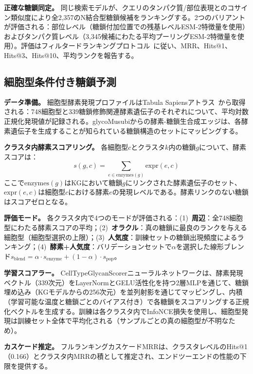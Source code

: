 \documentclass[11pt,a4paper]{ltjsarticle}
\begin{document}
\textbf{正確な糖鎖同定。}
同じ検索モデルが、クエリのタンパク質/部位表現とのコサイン類似度により全2,357のN結合型糖鎖候補をランキングする。2つのバリアントが評価される：部位レベル（糖鎖付加位置での残基レベルESM-2特徴量を使用）およびタンパク質レベル（3,345候補にわたる平均プーリングESM-2特徴量を使用）。評価はフィルタードランキングプロトコル~\cite{bordes2013}に従い、MRR、Hits@1、Hits@3、Hits@10、平均ランクを報告する。

\subsection{細胞型条件付き糖鎖予測}

\textbf{データ準備。}
細胞型酵素発現プロファイルはTabula Sapiensアトラス~\cite{tabulasapiens2022}から取得される：748細胞型と339糖鎖修飾関連酵素遺伝子のそれぞれについて、平均対数正規化発現値が記録される。glycoMusubiからの酵素-糖鎖生合成エッジは、各酵素遺伝子を生成することが知られている糖鎖構造のセットにマッピングする。

\textbf{クラスタ内酵素スコアリング。}
各細胞型$c$とクラスタ$k$内の糖鎖$g$について、酵素スコアは：
\begin{equation}
s(g, c) = \sum_{e \in \text{enzymes}(g)} \text{expr}(e, c)
\end{equation}
ここで$\text{enzymes}(g)$はKGにおいて糖鎖$g$にリンクされた酵素遺伝子のセット、$\text{expr}(e, c)$は細胞型$c$における酵素$e$の発現レベルである。酵素リンクのない糖鎖はスコアゼロとなる。

\textbf{評価モード。}
各クラスタ内で4つのモードが評価される：(1)~\textbf{周辺}：全748細胞型にわたる酵素スコアの平均；(2)~\textbf{オラクル}：真の糖鎖に最良のランクを与える細胞型（細胞型選択の上限）；(3)~\textbf{人気度}：訓練セットの糖鎖出現頻度によるランキング；(4)~\textbf{酵素+人気度}：バリデーションセットで$\alpha$を選択した線形ブレンド$s_{\text{blend}} = \alpha \cdot s_{\text{enzyme}} + (1 - \alpha) \cdot s_{\text{pop}}$。

\textbf{学習スコアラー。}
CellTypeGlycanScorerニューラルネットワークは、酵素発現ベクトル（339次元）をLayerNormとGELU活性化を持つ2層MLPを通じて、糖鎖埋め込み（KGモデルからの256次元）を並列射影を通じてマッピングし、内積（学習可能な温度と糖鎖ごとのバイアス付き）で各糖鎖をスコアリングする正規化ベクトルを生成する。訓練は各クラスタ内でInfoNCE損失を使用し、細胞型発現は訓練セット全体で平均化される（サンプルごとの真の細胞型が不明なため）。

\textbf{カスケード推定。}
フルランキングカスケードMRRは、クラスタレベルのHits@1（0.166）とクラスタ内MRRの積として推定され、エンドツーエンドの性能の下限を提供する。
\end{document}
